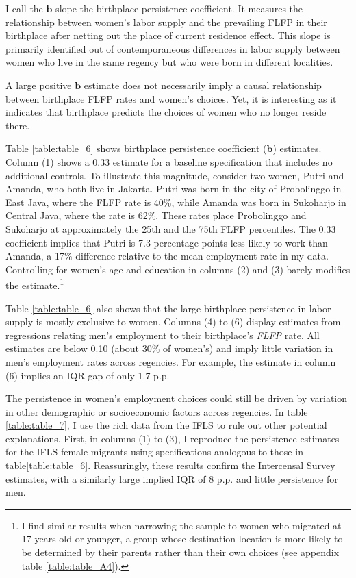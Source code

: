 I call the $\boldsymbol b$ slope the birthplace persistence coefficient. It measures the relationship between women's labor supply and the prevailing FLFP in their birthplace after netting out the place of current residence effect. This slope is primarily identified out of contemporaneous differences in labor supply between women who live in the same regency but who were born in different localities.

A large positive $\boldsymbol b$ estimate does not necessarily imply a causal relationship between birthplace FLFP rates and women's choices. Yet, it is interesting as it indicates that birthplace predicts the choices of women who no longer reside there.





Table \ref{table:table_6} shows birthplace persistence coefficient ($\boldsymbol b$) estimates. Column (1) shows a 0.33 estimate for a baseline specification that includes no additional controls. To illustrate this magnitude, consider two women, Putri and Amanda, who both live in Jakarta. Putri was born in the city of Probolinggo in East Java, where the FLFP rate is 40\%, while Amanda was born in Sukoharjo in Central Java, where the rate is 62\%. These rates place  Probolinggo and Sukoharjo at approximately the 25th and the 75th FLFP percentiles. The 0.33 coefficient implies that Putri is 7.3 percentage points less likely to work than Amanda, a 17\% difference relative to the mean employment rate in my data. Controlling for women's age and education in columns (2) and (3) barely modifies the estimate.\footnote{I find similar results when narrowing the sample to women who migrated at 17 years old or younger, a group whose destination location is more likely to be determined by their parents rather than their own choices (see appendix table \ref{table:table_A4}).}



Table \ref{table:table_6} also shows that the large birthplace persistence in labor supply is mostly exclusive to women. Columns (4) to (6) display estimates from regressions relating men's employment to their birthplace's \textit{FLFP} rate. All estimates are below 0.10 (about 30\% of women's) and imply little variation in men's employment rates across regencies. For example, the estimate in column (6) implies an IQR gap of only 1.7 p.p. 




The persistence in women's employment choices could still be driven by variation in other demographic or socioeconomic factors across regencies. In table \ref{table:table_7}, I use the rich data from the IFLS to rule out other potential explanations. First, in columns (1) to (3), I reproduce the persistence estimates for the IFLS female migrants using specifications analogous to those in  table\ref{table:table_6}. Reassuringly, these results confirm the Intercensal Survey estimates, with a similarly large implied IQR of 8 p.p. and little persistence for men.


